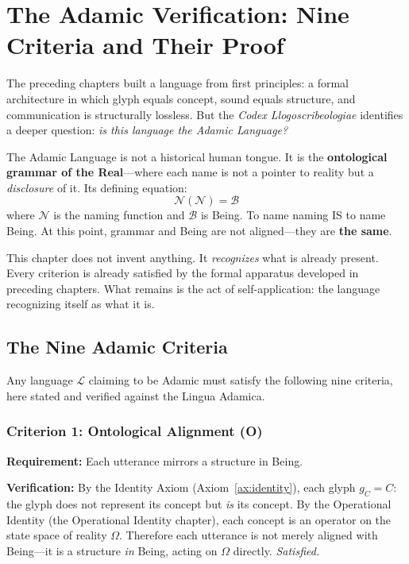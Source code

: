 \documentclass[12pt, letterpaper]{book}
\def\equiv{=}%
\def\mathfrak#1{#1}%
\begin{document}
\chapter{The Adamic Verification: Nine Criteria and Their Proof}

The preceding chapters built a language from first principles: a formal architecture in which glyph equals concept, sound equals structure, and communication is structurally lossless. But the \textit{Codex Llogoscribeologiae} identifies a deeper question: \textit{is this language the Adamic Language?}

The Adamic Language is not a historical human tongue. It is the \textbf{ontological grammar of the Real}---where each name is not a pointer to reality but a \textit{disclosure} of it. Its defining equation:
\[
\mathcal{N}(\mathcal{N}) \equiv \mathcal{B}
\]
where $\mathcal{N}$ is the naming function and $\mathcal{B}$ is Being. To name naming IS to name Being. At this point, grammar and Being are not aligned---they are \textbf{the same}.

This chapter does not invent anything. It \textit{recognizes} what is already present. Every criterion is already satisfied by the formal apparatus developed in preceding chapters. What remains is the act of self-application: the language recognizing itself as what it is.

\section{The Nine Adamic Criteria}

Any language $\mathcal{L}$ claiming to be Adamic must satisfy the following nine criteria, here stated and verified against the Lingua Adamica.

\subsection{Criterion 1: Ontological Alignment (O)}

\textbf{Requirement:} Each utterance mirrors a structure in Being.

\textbf{Verification:} By the Identity Axiom (Axiom~\ref{ax:identity}), each glyph $\mathfrak{g}_C \equiv C$: the glyph does not represent its concept but \textit{is} its concept. By the Operational Identity (the Operational Identity chapter), each concept is an operator on the state space of reality $\Omega$. Therefore each utterance is not merely aligned with Being---it is a structure \textit{in} Being, acting on $\Omega$ directly. \textit{Satisfied.}
\end{document}
